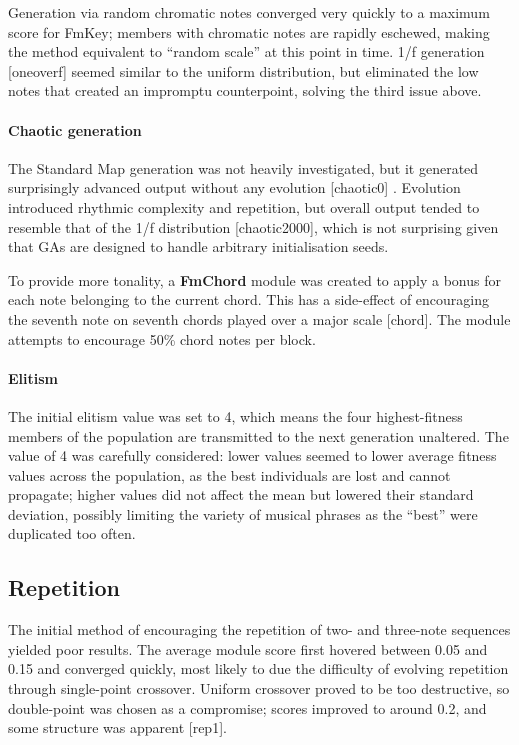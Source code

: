 Generation via random chromatic notes converged very quickly to a maximum score for FmKey; members with chromatic notes are rapidly eschewed, making the method equivalent to ``random scale'' at this point in time. 1/f generation [oneoverf] seemed similar to the uniform distribution, but eliminated the low notes that created an impromptu counterpoint, solving the third issue above.

\paragraph{Chaotic generation} The Standard Map generation was not heavily investigated, but it generated surprisingly advanced output without any evolution [chaotic0] \citep[as shown in][]{morris05}. Evolution introduced rhythmic complexity and repetition, but overall output tended to resemble that of the 1/f distribution [chaotic2000], which is not surprising given that GAs are designed to handle arbitrary initialisation seeds.

To provide more tonality, a \textbf{FmChord} module was created to apply a bonus for each note belonging to the current chord. This has a side-effect of encouraging
the seventh note on seventh chords played over a major scale [chord]. The module attempts to encourage 50\% chord notes per block.

\paragraph{Elitism} The initial elitism value was set to 4, which means the four highest-fitness members of the population are transmitted to the next generation unaltered. The value of 4 was carefully considered: lower values seemed to lower average fitness values across the population, as the best individuals are lost and cannot propagate; higher values did not affect the mean but lowered their standard deviation, possibly limiting the variety of musical phrases as the ``best'' were duplicated too often.

\subsection{Repetition}

The initial method of encouraging the repetition of two- and three-note sequences yielded poor results. The average module score first hovered between 0.05 and 0.15 and converged quickly, most likely to due the difficulty of evolving repetition through single-point crossover. Uniform crossover proved to be too destructive, so double-point was chosen as a compromise; scores improved to around 0.2, and some structure was apparent [rep1].

